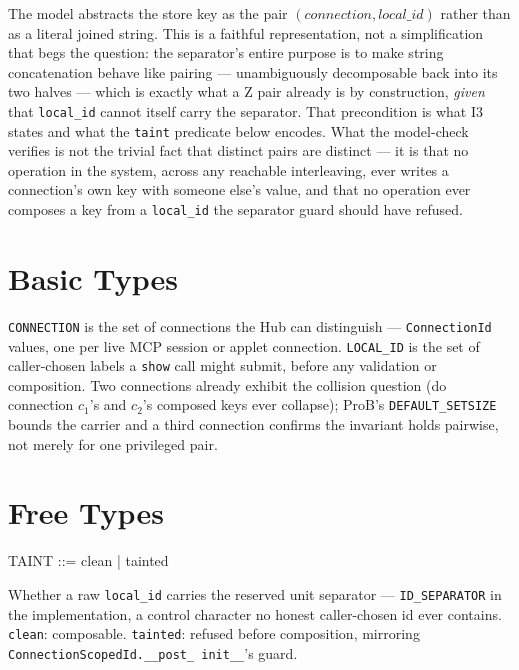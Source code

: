 \documentclass[a4paper,10pt,fleqn]{article}
\begin{document}
The model abstracts the store key as the pair
$(\mathit{connection}, \mathit{local\_id})$ rather than as a literal joined
string. This is a faithful representation, not a simplification that begs the
question: the separator's entire purpose is to make string concatenation
behave like pairing --- unambiguously decomposable back into its two halves ---
which is exactly what a Z pair already is by construction, \emph{given} that
\texttt{local\_id} cannot itself carry the separator. That precondition is
what I3 states and what the \texttt{taint} predicate below encodes. What the
model-check verifies is not the trivial fact that distinct pairs are distinct
--- it is that no operation in the system, across any reachable interleaving,
ever writes a connection's own key with someone else's value, and that no
operation ever composes a key from a \texttt{local\_id} the separator guard
should have refused.

\section{Basic Types}

\begin{zed}
\end{zed}

\texttt{CONNECTION} is the set of connections the Hub can distinguish ---
\texttt{ConnectionId} values, one per live MCP session or applet connection.
\texttt{LOCAL\_ID} is the set of caller-chosen labels a \texttt{show} call
might submit, before any validation or composition. Two connections already
exhibit the collision question (do connection $c_1$'s and $c_2$'s composed
keys ever collapse); ProB's \texttt{DEFAULT\_SETSIZE} bounds the carrier and a
third connection confirms the invariant holds pairwise, not merely for one
privileged pair.

\section{Free Types}

\begin{zed}
  TAINT ::= clean | tainted
\end{zed}

Whether a raw \texttt{local\_id} carries the reserved unit separator ---
\texttt{ID\_SEPARATOR} in the implementation, a control character no honest
caller-chosen id ever contains. \texttt{clean}: composable. \texttt{tainted}:
refused before composition, mirroring \texttt{ConnectionScopedId.\_\_post\_\allowbreak
init\_\_}'s guard.
\end{document}
